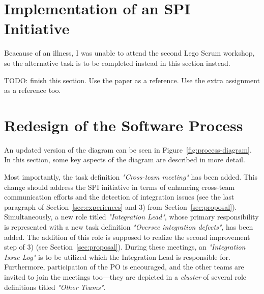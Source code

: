 \documentclass[conference]{IEEEtran}
\begin{document}
\section{Implementation of an SPI Initiative}
\label{sec:implementation}

Beacause of an illness, I was unable to attend the second Lego Scrum workshop,
so the alternative task is to be completed instead in this section instead.

TODO: finish this section. Use the paper \cite{Niazi2010} as a reference.
Use the extra assignment as a reference too.




\section{Redesign of the Software Process}
\label{sec:redesign}

An updated version of the diagram can be seen in
Figure~\ref{fig:process-diagram}. In this section, some key aspects of the
diagram are described in more detail.

Most importantly, the task definition \textit{"Cross-team meeting"} has been
added. This change should address the SPI initiative in terms of enhancing
cross-team communication efforts and the detection of integration issues (see
the last paragraph of Section~\ref{sec:experiences} and 3) from
Section~\ref{sec:proposal}). Simultaneously, a new role titled
\textit{"Integration Lead"}, whose primary responsibility is represented with a
new task definition \textit{"Oversee integration defects"}, has been added. The
addition of this role is supposed to realize the second improvement step of 3)
(see Section~\ref{sec:proposal}). During these meetings, an
\textit{"Integration Issue Log"} is to be utilized which the Integration Lead
is responsible for. Furthermore, participation of the PO is encouraged, and the
other teams are invited to join the meetings too---they are depicted in a
\textit{cluster} of several role definitions titled \textit{"Other Teams"}.
\end{document}
